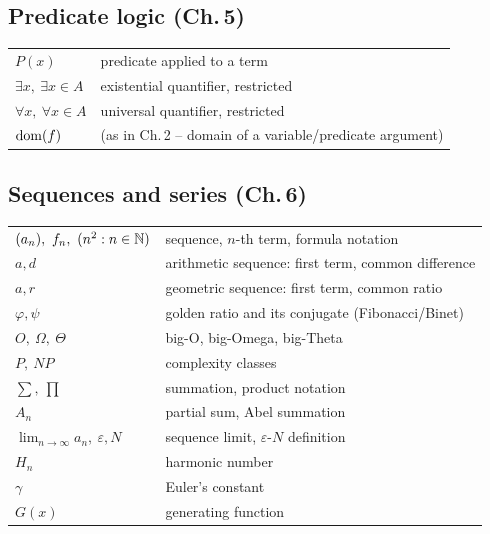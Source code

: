 \subsection*{Predicate logic (Ch.\,5)}
\begin{longtable}{ll}
$P(x)$ & predicate applied to a term \\
$\exists x,\ \exists x\in A$ & existential quantifier, restricted \\
$\forall x,\ \forall x\in A$ & universal quantifier, restricted \\
$\operatorname{dom}(f)$ & (as in Ch.\,2 -- domain of a variable/predicate argument) \\
\end{longtable}

\subsection*{Sequences and series (Ch.\,6)}
\begin{longtable}{ll}
$(a_n),\ f_n,\ (n^2:n\in\N)$ & sequence, $n$-th term, formula notation \\
$a,d$ & arithmetic sequence: first term, common difference \\
$a,r$ & geometric sequence: first term, common ratio \\
$\varphi,\psi$ & golden ratio and its conjugate (Fibonacci/Binet) \\
$O,\ \Omega,\ \Theta$ & big-O, big-Omega, big-Theta \\
$P,\ NP$ & complexity classes \\
$\sum,\ \prod$ & summation, product notation \\
$A_n$ & partial sum, Abel summation \\
$\lim_{n\to\infty}a_n,\ \varepsilon,N$ & sequence limit, $\varepsilon$-$N$ definition \\
$H_n$ & harmonic number \\
$\gamma$ & Euler's constant \\
$G(x)$ & generating function \\
\end{longtable}

